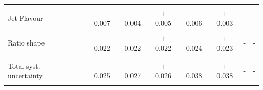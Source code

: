 \begin{table}[!htp]
\begin{tabular}{lcccccccc}
 & & & & & & & & \\ 
 Jet Flavour & & $\pm$ 0.007 & $\pm$ 0.004 & $\pm$ 0.005 & $\pm$ 0.006 & $\pm$ 0.003 & - & - \\
 & & & & & & & & \\ 
 Ratio shape & & $\pm$ 0.022 & $\pm$ 0.022 & $\pm$ 0.022 & $\pm$ 0.024 & $\pm$ 0.023 & - & - \\
 & & & & & & & & \\ 
\hline
 & & & & & & & & \\
 Total syst. uncertainty & & $\pm$ 0.025 & $\pm$ 0.027 & $\pm$ 0.026 & $\pm$ 0.038 & $\pm$ 0.038 & - & - \\
 & & & & & & & & \\ 
\hline
\end{tabular}%
\end{table} 

